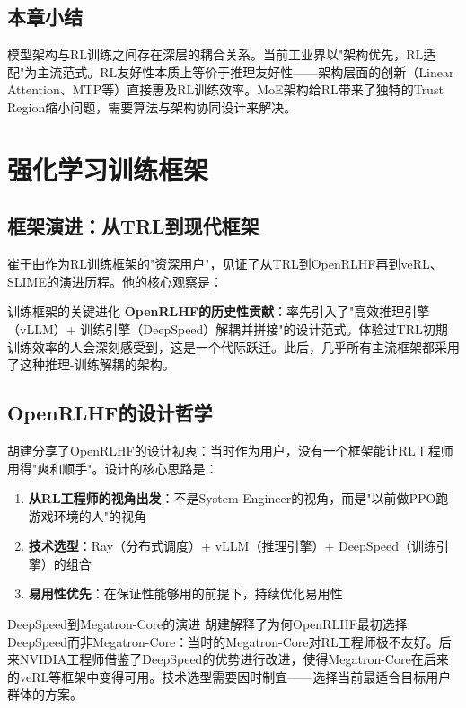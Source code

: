 \documentclass[a4paper]{article}
\begin{document}
\subsection{本章小结}

模型架构与RL训练之间存在深层的耦合关系。当前工业界以"架构优先，RL适配"为主流范式。RL友好性本质上等价于推理友好性——架构层面的创新（Linear Attention、MTP等）直接惠及RL训练效率。MoE架构给RL带来了独特的Trust Region缩小问题，需要算法与架构协同设计来解决。


\section{强化学习训练框架}

\subsection{框架演进：从TRL到现代框架}

崔干曲作为RL训练框架的"资深用户"，见证了从TRL到OpenRLHF再到veRL、SLIME的演进历程。他的核心观察是：

\begin{importantbox}{训练框架的关键进化}
\textbf{OpenRLHF的历史性贡献}：率先引入了"高效推理引擎（vLLM）+ 训练引擎（DeepSpeed）解耦并拼接"的设计范式。体验过TRL初期训练效率的人会深刻感受到，这是一个代际跃迁。此后，几乎所有主流框架都采用了这种推理-训练解耦的架构。
\end{importantbox}

\subsection{OpenRLHF的设计哲学}

胡建分享了OpenRLHF的设计初衷：当时作为用户，没有一个框架能让RL工程师用得"爽和顺手"。设计的核心思路是：

\begin{enumerate}
    \item \textbf{从RL工程师的视角出发}：不是System Engineer的视角，而是"以前做PPO跑游戏环境的人"的视角
    \item \textbf{技术选型}：Ray（分布式调度）+ vLLM（推理引擎）+ DeepSpeed（训练引擎）的组合
    \item \textbf{易用性优先}：在保证性能够用的前提下，持续优化易用性
\end{enumerate}

\begin{knowledgebox}{DeepSpeed到Megatron-Core的演进}
胡建解释了为何OpenRLHF最初选择DeepSpeed而非Megatron-Core：当时的Megatron-Core对RL工程师极不友好。后来NVIDIA工程师借鉴了DeepSpeed的优势进行改进，使得Megatron-Core在后来的veRL等框架中变得可用。技术选型需要因时制宜——选择当前最适合目标用户群体的方案。
\end{knowledgebox}
\end{document}
